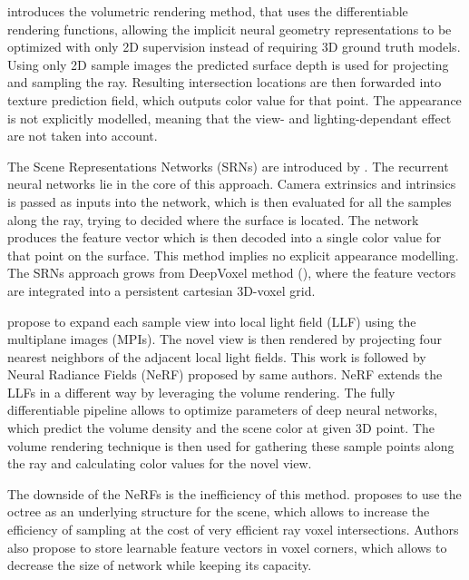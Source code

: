 \cite{niemeyer2020differentiable} introduces the volumetric rendering method,
that uses the differentiable rendering functions,
allowing the implicit neural geometry representations to be optimized
with only 2D supervision instead of requiring 3D ground truth models.
Using only 2D sample images the predicted surface depth is used
for projecting and sampling the ray.
Resulting intersection locations are then forwarded into texture prediction field,
which outputs color value for that point.
The appearance is not explicitly modelled, meaning that the view- and lighting-dependant effect are not taken into account.


The Scene Representations Networks (SRNs) are introduced by \cite{sitzmann2019srns}.
The recurrent neural networks lie in the core of this approach.
Camera extrinsics and intrinsics is passed as inputs into the network,
which is then evaluated for all the samples along the ray,
trying to decided where the surface is located.
The network produces the feature vector which is then decoded into a single color value for that point on the surface.
This method implies no explicit appearance modelling.
The SRNs approach grows from DeepVoxel method (\cite{sitzmann2019deepvoxels}),
where the feature vectors are integrated into a persistent cartesian 3D-voxel grid.

\cite{mildenhall2019local} propose to expand each sample view into local light field (LLF) using the multiplane images (MPIs).
The novel view is then rendered by projecting four nearest neighbors of the adjacent local light fields.
This work is followed by Neural Radiance Fields (NeRF) \cite{mildenhall2020nerf} proposed by same authors.
NeRF extends the LLFs in a different way by leveraging the volume rendering.
The fully differentiable pipeline allows to optimize parameters of deep neural networks,
which predict the volume density and the scene color at given 3D point.
The volume rendering technique is then used for gathering these sample points along the ray
and calculating color values for the novel view.

The downside of the NeRFs is the inefficiency of this method.
\cite{liu2021neural} proposes to use the octree as an underlying structure for the scene,
which allows to increase the efficiency of sampling at the cost of very efficient ray voxel intersections.
Authors also propose to store learnable feature vectors in voxel corners,
which allows to decrease the size of network while keeping its capacity.

